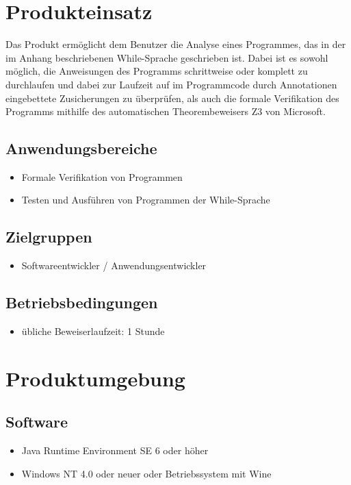 \documentclass[a4paper,10pt]{article}
\begin{document}
\section{Produkteinsatz}
Das Produkt erm\"{o}glicht dem Benutzer die Analyse eines Programmes, das in der im Anhang beschriebenen While-Sprache geschrieben ist. Dabei ist es sowohl m\"{o}glich, die Anweisungen des Programms schrittweise oder komplett zu durchlaufen und dabei zur Laufzeit auf im Programmcode durch Annotationen eingebettete Zusicherungen zu \"{u}berpr\"{u}fen, als auch die formale Verifikation des Programms mithilfe des automatischen Theorembeweisers Z3 von Microsoft.

\subsection{Anwendungsbereiche}
\begin{itemize}
  \item Formale Verifikation von Programmen
  \item Testen und Ausführen von Programmen der While-Sprache
\end{itemize}

\subsection{Zielgruppen}
\begin{itemize}
  \item Softwareentwickler / Anwendungsentwickler
\end{itemize}

\subsection{Betriebsbedingungen}
\begin{itemize}
  \item \"{u}bliche Beweiserlaufzeit: 1 Stunde
\end{itemize}

\section{Produktumgebung}
\subsection{Software}
\begin{itemize}
  \item Java Runtime Environment SE 6 oder h\"{o}her
  \item Windows NT 4.0 oder neuer oder Betriebssystem mit Wine
\end{itemize}
\end{document}
